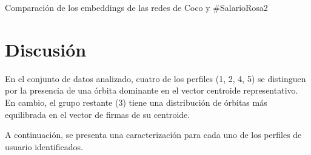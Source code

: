 \begin{table}[h]
    \begin{center}
        \caption{Comparación de los embeddings de las redes de Coco y \#SalarioRosa2}
    \end{center}
\end{table}


\section{Discusión}

En el conjunto de datos analizado, cuatro de los perfiles (1, 2, 4, 5) se distinguen por la presencia de una órbita dominante en el vector centroide representativo. En cambio, el grupo restante (3) tiene una distribución de órbitas más equilibrada en el vector de firmas de su centroide.

A continuación, se presenta una caracterización para cada uno de los perfiles de usuario identificados.  

